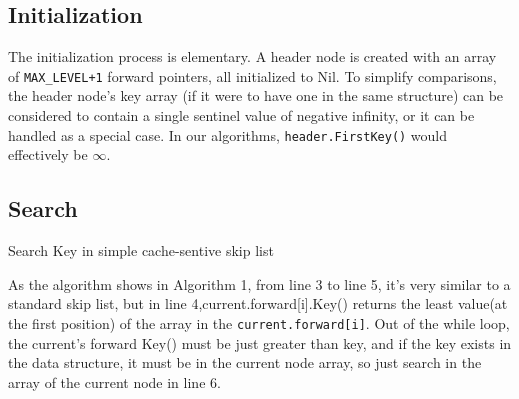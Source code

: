 \documentclass[sigconf, nonacm, letterpaper,top=2cm,bottom=2cm,left=3cm,right=3cm,marginparwidth=1.75cm]{acmart}
\begin{document}
\subsection{Initialization}
The initialization process is elementary. A header node is created with an array of \texttt{MAX\_LEVEL+1} forward pointers, all initialized to Nil. To simplify comparisons, the header node's key array (if it were to have one in the same structure) can be considered to contain a single sentinel value of negative infinity, or it can be handled as a special case. In our algorithms, \texttt{header.FirstKey()} would effectively be $\infty$.


\subsection{Search}
\begin{algorithm}
    \caption{Search Key in simple cache-sentive skip list}
\end{algorithm}

As the algorithm shows in Algorithm 1, from line 3 to line 5, it’s very similar to a standard skip list, but in line 4,current.forward[i].Key() returns the least value(at the first position) of the array in the \texttt{current.forward[i]}. Out of the while loop, the current’s forward Key() must be just greater than key, and if the key exists in the data structure, it must be in the current node array, so just search in the array of the current node in line 6.
\end{document}

